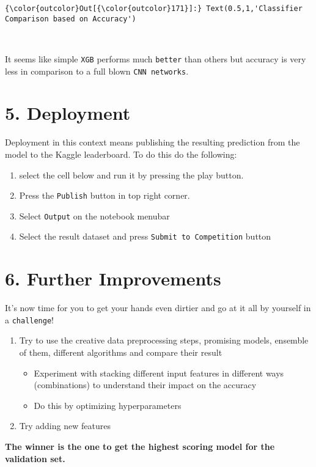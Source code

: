 \documentclass[11pt]{article}
\providecommand{\tightlist}{%
      \setlength{\itemsep}{0pt}\setlength{\parskip}{0pt}}
\begin{document}
\begin{Verbatim}[commandchars=\\\{\}]
{\color{outcolor}Out[{\color{outcolor}171}]:} Text(0.5,1,'Classifier Comparison based on Accuracy')
\end{Verbatim}
            
    \begin{center}
    \end{center}
    { \hspace*{\fill} \\}
    
    It seems like simple \texttt{XGB} performs much \texttt{better} than
others but accuracy is very less in comparison to a full blown
\texttt{CNN\ networks}.

    \hypertarget{deployment}{%
\section{5. Deployment}\label{deployment}}

    Deployment in this context means publishing the resulting prediction
from the model to the Kaggle leaderboard. To do this do the following:

\begin{enumerate}
\def\labelenumi{\arabic{enumi}.}
\tightlist
\item
  select the cell below and run it by pressing the play button.
\item
  Press the \texttt{Publish} button in top right corner.
\item
  Select \texttt{Output} on the notebook menubar
\item
  Select the result dataset and press \texttt{Submit\ to\ Competition}
  button
\end{enumerate}

    \hypertarget{further-improvements}{%
\section{6. Further Improvements}\label{further-improvements}}

    It's now time for you to get your hands even dirtier and go at it all by
yourself in a \texttt{challenge}!

\begin{enumerate}
\def\labelenumi{\arabic{enumi}.}
\tightlist
\item
  Try to use the creative data preprocessing steps, promising models,
  ensemble of them, different algorithms and compare their result

  \begin{itemize}
  \tightlist
  \item
    Experiment with stacking different input features in different ways
    (combinations) to understand their impact on the accuracy
  \item
    Do this by optimizing hyperparameters
  \end{itemize}
\item
  Try adding new features
\end{enumerate}

\textbf{The winner is the one to get the highest scoring model for the
validation set.}


    
    
    
    
\end{document}
